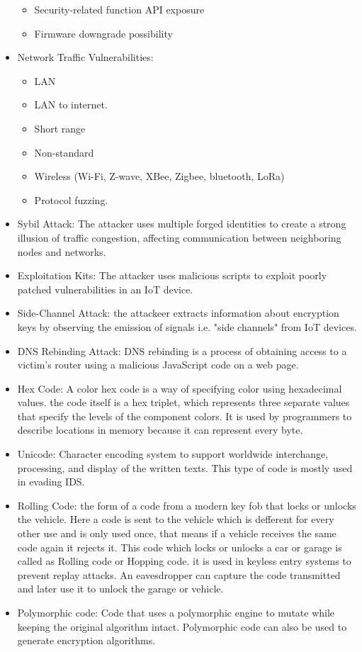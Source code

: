 \begin{itemize}
\begin{itemize}
        \item Security-related function API exposure
        \item Firmware downgrade possibility
    \end{itemize}
    \item Network Traffic Vulnerabilities:
    \begin{itemize}
        \item LAN
        \item LAN to internet.
        \item Short range
        \item Non-standard
        \item Wireless (Wi-Fi, Z-wave, XBee, Zigbee, bluetooth, LoRa)
        \item Protocol fuzzing.
    \end{itemize}
    \item Sybil Attack: The attacker uses multiple forged identities to create a strong illusion of traffic congestion, affecting communication between neighboring nodes and networks.
    \item Exploitation Kits: The attacker uses malicious scripts to exploit poorly patched vulnerabilities in an IoT device.
    \item Side-Channel Attack: the attackeer extracts information about encryption keys by observing the emission of signals i.e. "side channels" from IoT devices.
    \item DNS Rebinding Attack: DNS rebinding is a process of obtaining access to a victim's router using a malicious JavaScript code on a web page.
    \item Hex Code: A color hex code is a way of specifying color using hexadecimal values. the code itself is a hex triplet, which represents three separate values that specify the levels of the component colors. It is used by programmers to describe locations in memory because it can represent every byte.
    \item Unicode: Character encoding system to support worldwide interchange, processing, and display of the written texts. This type of code is mostly used in evading IDS.
    \item Rolling Code: the form of a code from a modern key fob that locks or unlocks the vehicle. Here a code is sent to the vehicle which is defferent for every other use and is only used once, that means if a vehicle receives the same code again it rejects it. This code which locks or unlocks a car or garage is called as Rolling code or Hopping code. it is used in keyless entry systems to prevent replay attacks. An eavesdropper can capture the code transmitted and later use it to unlock the garage or vehicle.
    \item Polymorphic code: Code that uses a polymorphic engine to mutate while keeping the original algorithm intact. Polymorphic code can also be used to generate encryption algorithms.
\end{itemize}
